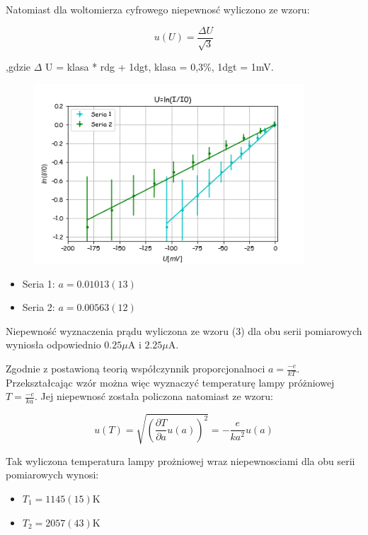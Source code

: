 \documentclass[a4paper,10pt]{article}
\begin{document}
\vspace{0,4cm}
Natomiast dla woltomierza cyfrowego niepewnosć wyliczono ze wzoru:

\begin{equation}
u(U) = \frac{\Delta U}{\sqrt{3}}
\end{equation}

,gdzie $\Delta$ U = klasa * rdg + 1dgt, klasa = 0,3\%, 1dgt = 1mV.

\begin{figure}[H]
\centering
\includegraphics[width=0.9\textwidth]{zarzenie.png}
\end{figure}

\begin{itemize}
  \item Seria 1: $a = 0.01013(13)$
  \item Seria 2: $a = 0.00563(12)$
\end{itemize}

Niepewność wyznaczenia prądu wyliczona ze wzoru (3) dla obu serii pomiarowych wyniosła odpowiednio $0.25\mu$A i $2.25\mu$A.

Zgodnie z postawioną teorią współczynnik proporcjonalnoci $a = \frac{-e}{kT}$. Przekształcając wzór można więc wyznaczyć temperaturę lampy próżniowej $T = \frac{-e}{ka}$. Jej niepewnosć została  policzona natomiast ze wzoru:

\begin{equation}
u(T) = \sqrt{(\frac{\partial T}{\partial a} u(a))^2 } = -\frac{e}{ka^2} u(a)
\end{equation}

Tak wyliczona temperatura lampy prożniowej wraz niepewnosciami dla obu serii pomiarowych wynosi:

\begin{itemize}
  \item $T_1 = 1145(15)$K
  \item $T_2 = 2057(43)$K
\end{itemize}
\end{document}
